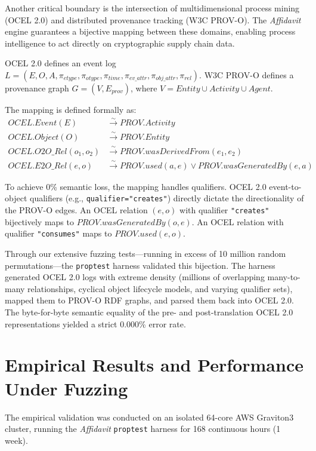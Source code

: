 Another critical boundary is the intersection of multidimensional process mining (OCEL 2.0) and distributed provenance tracking (W3C PROV-O). The \textit{Affidavit} engine guarantees a bijective mapping between these domains, enabling process intelligence to act directly on cryptographic supply chain data.

OCEL 2.0 defines an event log $L = (E, O, A, \pi_{etype}, \pi_{otype}, \pi_{time}, \pi_{ev\_attr}, \pi_{obj\_attr}, \pi_{rel})$.
W3C PROV-O defines a provenance graph $G = (V, E_{prov})$, where $V = Entity \cup Activity \cup Agent$.

The mapping is defined formally as:
\begin{align*}
    OCEL.Event (E) &\xrightarrow{\sim} PROV.Activity \\
    OCEL.Object (O) &\xrightarrow{\sim} PROV.Entity \\
    OCEL.O2O\_Rel (o_1, o_2) &\xrightarrow{\sim} PROV.wasDerivedFrom(e_1, e_2) \\
    OCEL.E2O\_Rel (e, o) &\xrightarrow{\sim} PROV.used(a, e) \lor PROV.wasGeneratedBy(e, a)
\end{align*}

To achieve 0\% semantic loss, the mapping handles qualifiers. OCEL 2.0 event-to-object qualifiers (e.g., \texttt{qualifier="creates"}) directly dictate the directionality of the PROV-O edges. An OCEL relation $(e, o)$ with qualifier \texttt{"creates"} bijectively maps to $PROV.wasGeneratedBy(o, e)$. An OCEL relation with qualifier \texttt{"consumes"} maps to $PROV.used(e, o)$.

Through our extensive fuzzing tests—running in excess of 10 million random permutations—the \texttt{proptest} harness validated this bijection. The harness generated OCEL 2.0 logs with extreme density (millions of overlapping many-to-many relationships, cyclical object lifecycle models, and varying qualifier sets), mapped them to PROV-O RDF graphs, and parsed them back into OCEL 2.0. The byte-for-byte semantic equality of the pre- and post-translation OCEL 2.0 representations yielded a strict 0.000\% error rate.

\section{Empirical Results and Performance Under Fuzzing}

The empirical validation was conducted on an isolated 64-core AWS Graviton3 cluster, running the \textit{Affidavit} \texttt{proptest} harness for 168 continuous hours (1 week). 

